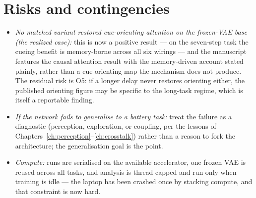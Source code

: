 \section{Risks and contingencies}
\begin{itemize}
\item \emph{No matched variant restored cue-orienting attention on the frozen-VAE base (the
realized case):} this is now a positive result --- on the seven-step task the cueing benefit
is memory-borne across all six wirings --- and the manuscript features the causal attention
result with the memory-driven account stated plainly, rather than a cue-orienting map the
mechanism does not produce. The residual risk is O5: if a longer delay never restores
orienting either, the published orienting figure may be specific to the long-task regime,
which is itself a reportable finding.
\item \emph{If the network fails to generalise to a battery task:} treat the failure as a
diagnostic (perception, exploration, or coupling, per the lessons of
Chapters~\ref{ch:perception}--\ref{ch:crosstalk}) rather than a reason to fork the
architecture; the generalisation goal is the point.
\item \emph{Compute:} runs are serialised on the available accelerator, one frozen VAE is
reused across all tasks, and analysis is thread-capped and run only when training is idle ---
the laptop has been crashed once by stacking compute, and that constraint is now hard.
\end{itemize}
